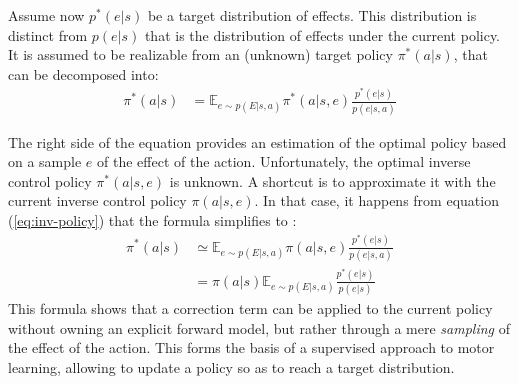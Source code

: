 \documentclass[runningheads]{llncs}
\begin{document}
%

Assume now $p^*(e|s)$ be a target distribution of effects. This distribution is distinct from  $p(e|s)$ that is the distribution of effects under the current policy. It is assumed to be realizable from an (unknown) target policy $\pi^*(a|s)$, that can be decomposed into:
\begin{align}
\pi^*(a|s) &= \mathbb{E}_{e\sim p(E|s,a)} \pi^*(a|s,e)\frac{p^*(e|s)}{p(e|s,a)}
\end{align}

The right side of the equation provides an estimation of the optimal policy based on a sample $e$ of the effect of the action. Unfortunately, the optimal inverse control policy $\pi^*(a|s,e)$ is unknown. A shortcut is to approximate it with the current inverse control policy $\pi(a|s,e)$.
In that case, it happens from equation (\ref{eq:inv-policy}) that the formula simplifies to :
\begin{align}\label{eq:bayesian-update}
\pi^*(a|s) &\simeq \mathbb{E}_{e\sim p(E|s,a)} \pi(a|s,e)\frac{p^*(e|s)}{p(e|s,a)}\\
&= \pi(a|s) \mathbb{E}_{e\sim p(E|s,a)} \frac{p^*(e|s)}{p(e|s)}
\end{align}
This formula shows that a correction term can be applied to the current policy without owning an explicit forward model, but rather through a mere \emph{sampling} of the effect of the action. This forms the basis of a supervised approach to motor learning, allowing to update a policy so as to reach a target distribution. 

%
%
%
\end{document}
